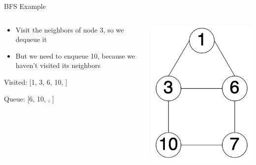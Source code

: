 \documentclass[
  ignorenonframetext,
]{beamer}
\begin{document}
\begin{frame}{BFS Example}
\protect\hypertarget{bfs-example-3}{}
\begin{columns}[T]
\begin{column}{0.6\textwidth}
\begin{itemize}
\item
  Visit the neighbors of node 3, so we dequeue it
\item
  But we need to enqueue 10, because we haven't visited its neighbors
  \vspace{1cm}
\end{itemize}

Visited: {[}1, 3, 6, 10, {]}

Queue: {[}6, 10, , {]}
\end{column}

\begin{column}{0.4\textwidth}
\includegraphics{images/graph-bfs.png}
\end{column}
\end{columns}
\end{frame}
\end{document}
